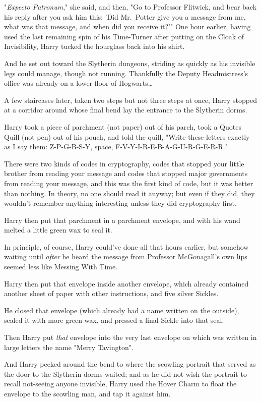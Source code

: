 "\emph{Expecto Patronum}," she said, and then, "Go to Professor Flitwick, and 
bear back his reply after you ask him this: 'Did Mr.~Potter give you a message 
from me, what was that message, and when did you receive it?'"
\sbreak
One hour earlier, having used the last remaining spin of his Time-Turner after 
putting on the Cloak of Invisibility, Harry tucked the hourglass back into his 
shirt.

And he set out toward the Slytherin dungeons, striding as quickly as his 
invisible legs could manage, though not running. Thankfully the Deputy 
Headmistress's office was already on a lower floor of Hogwarts{\ldots}

A few staircases later, taken two steps but not three steps at once, Harry 
stopped at a corridor around whose final bend lay the entrance to the Slytherin 
dorms.

Harry took a piece of parchment (not paper) out of his parch, took a Quotes 
Quill (not pen) out of his pouch, and told the quill, "Write these letters 
exactly as I say them: Z-P-G-B-S-Y, space, F-V-Y-I-R-E-B-A-G-U-R-G-E-R-R."

There were two kinds of codes in cryptography, codes that stopped your little 
brother from reading your message and codes that stopped major governments from 
reading your message, and this was the first kind of code, but it was better 
than nothing. In theory, no one should read it anyway; but even if they did, 
they wouldn't remember anything interesting unless they did cryptography first.

Harry then put that parchment in a parchment envelope, and with his wand melted 
a little green wax to seal it.

In principle, of course, Harry could've done all that hours earlier, but 
somehow waiting until \emph{after} he heard the message from Professor 
McGonagall's own lips seemed less like Messing With Time.

Harry then put that envelope inside another envelope, which already contained 
another sheet of paper with other instructions, and five silver Sickles.

He closed that envelope (which already had a name written on the outside), 
sealed it with more green wax, and pressed a final Sickle into that seal.

Then Harry put \emph{that} envelope into the very last envelope on which was 
written in large letters the name "Merry Tavington".

And Harry peeked around the bend to where the scowling portrait that served as 
the door to the Slytherin dorms waited; and as he did not wish the portrait to 
recall not-seeing anyone invisible, Harry used the Hover Charm to float the 
envelope to the scowling man, and tap it against him.

